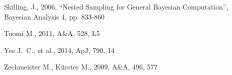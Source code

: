 \documentclass[useAMS,usenatbib]{mn2e}
\begin{document}
\begin{thebibliography}{99}
 Skilling, 
J., 2006, ``Nested Sampling for General Bayesian Computation'', Bayesian 
Analysis 4, pp. 833-860

 Tuomi M., 2011, A\&A, 528, L5 

Yee J.~C., et al., 2014, ApJ, 790, 14 

 Zechmeister M., K{\"u}rster M., 2009, A\&A, 496, 577  

\end{thebibliography}
\end{document}
